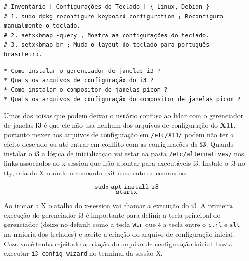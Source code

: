 \documentclass[12pt,a4paper]{article}
\begin{document}
\begin{lstlisting}
# Inventário [ Configurações do Teclado ] { Linux, Debian }
# 1. sudo dpkg-reconfigure keyboard-configuration ; Reconfigura manualmente o teclado.
# 2. setxkbmap -query ; Mostra as configurações do teclado.
# 3. setxkbmap br ; Muda o layout do teclado para português brasileiro.
\end{lstlisting}

\vspace{\baselineskip}

\begin{lstlisting}
* Como instalar o gerenciador de janelas i3 ?
* Quais os arquivos de configuração do i3 ?
* Como instalar o compositor de janelas picom ?
* Quais os arquivos de configuração do compositor de janelas picom ? 
\end{lstlisting}

\vspace{\baselineskip}

Umas das coisas que podem deixar o usuário confuso ao lidar com o gerenciador de janelas \textbf{i3} é que ele não usa nenhum dos arquivos de configuração do \textbf{X11}, portanto mexer nos arquivos de configuração em \texttt{/etc/X11/} podem não ter o efeito desejado ou até entrar em conflito com as configurações do \textbf{i3}. Quando instalar o i3 a lógica de inicialização vai estar na pasta \texttt{/etc/alternatives/} nos links associados ao x-session que irão apontar para executáveis i3. Instale o i3 no tty, saia do X usando o comando exit e execute os comandos:

$$ \texttt{sudo apt install i3} $$
$$ \texttt{startx} $$

Ao iniciar o X o atalho do x-session vai chamar a execução do i3. A primeira execução do gerenciador i3 é importante para definir a tecla principal do gerenciador (deixe no default como a tecla \texttt{Win} que é a tecla entre o \texttt{ctrl} e \texttt{alt} na maioria dos teclados) e aceite a criação do arquivo de configuração inicial. Caso você tenha rejeitado a criação do arquivo de configuração inicial, basta executar \texttt{i3-config-wizard} no terminal da sessão X. \\
\end{document}
